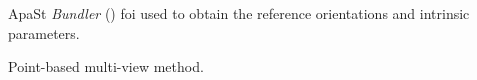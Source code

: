 \begin{frame}{ApaSt}
  {\em Bundler} (\cite{Snavely2006}) foi used to obtain the reference orientations and intrinsic parameters.

  Point-based multi-view method.

  \begin{center}
  \end{center}
\end{frame}



